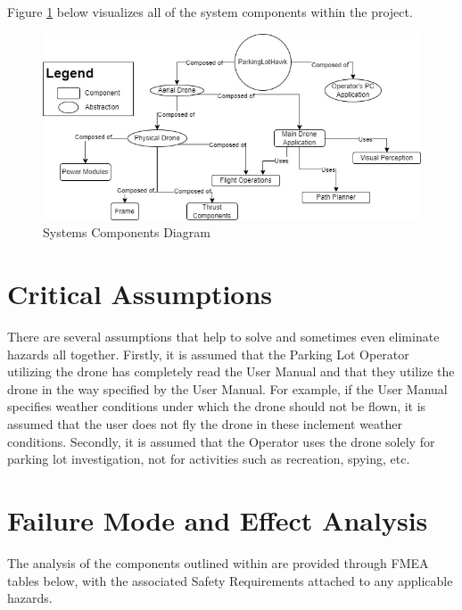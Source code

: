 \documentclass{article}
\begin{document}
\clearpage
Figure \ref{fig:SystemCompDiagram} below visualizes all of the system components within the project. 


\begin{figure}[!h]
    \centering
    \includegraphics[width=1\textwidth]{HazardAnalysis/System Components.jpg}
    \caption{Systems Components Diagram}
    \label{fig:SystemCompDiagram}
\end{figure}




\section{Critical Assumptions}
There are several assumptions that help to solve and sometimes even eliminate hazards all together. Firstly, it is assumed that the Parking Lot Operator utilizing the drone has completely read the User Manual and that they utilize the drone in the way specified by the User Manual. For example, if the User Manual specifies weather conditions under which the drone should not be flown, it is assumed that the user does not fly the drone in these inclement weather conditions. Secondly, it is assumed that the Operator uses the drone solely for parking lot investigation, not for activities such as recreation, spying, etc.  



\section{Failure Mode and Effect Analysis}

The analysis of the components outlined within  are provided through FMEA tables below, with the associated Safety Requirements attached to any applicable hazards.
\end{document}
